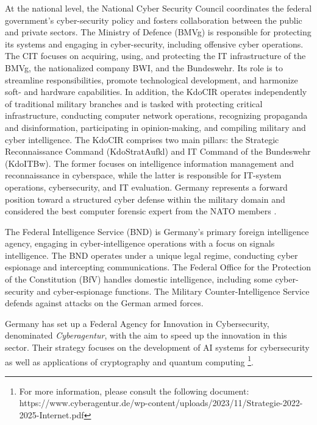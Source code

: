 At the national level, the National Cyber Security Council coordinates the federal government's cyber-security policy and fosters collaboration between the public and private sectors. The Ministry of Defence (BMVg) is responsible for protecting its systems and engaging in cyber-security, including offensive cyber operations. The CIT focuses on acquiring, using, and protecting the IT infrastructure of the BMVg, the nationalized company BWI, and the Bundeswehr. Its role is to streamline responsibilities, promote technological development, and harmonize soft- and hardware capabilities. In addition, the KdoCIR operates independently of traditional military branches and is tasked with protecting critical infrastructure, conducting computer network operations, recognizing propaganda and disinformation, participating in opinion-making, and compiling military and cyber intelligence. The KdoCIR comprises two main pillars: the Strategic Reconnaissance Command (KdoStratAufkl) and IT Command of the Bundeswehr (KdoITBw). The former focuses on intelligence information management and reconnaissance in cyberspace, while the latter is responsible for IT-system operations, cybersecurity, and IT evaluation. Germany represents a forward position toward a structured cyber defense within the military domain and considered the best computer forensic expert from the NATO members \autocite{leinhos_2020_cyber}. 

The Federal Intelligence Service (BND) is Germany's primary foreign intelligence agency, engaging in cyber-intelligence operations with a focus on signals intelligence. The BND operates under a unique legal regime, conducting cyber espionage and intercepting communications. The Federal Office for the Protection of the Constitution (BfV) handles domestic intelligence, including some cyber-security and cyber-espionage functions. The Military Counter-Intelligence Service defends against attacks on the German armed forces. \autocite{theinternationalinstituteforstrategicstudies_2023_cyber, federalministryoftheinteriorbuildingandcommunity_2021_cyber}

Germany has set up a Federal Agency for Innovation in Cybersecurity, denominated \textit{Cyberagentur}, with the aim to speed up the innovation in this sector. Their strategy focuses on the development of AI systems for cybersecurity as well as applications of cryptography and quantum computing \footnote{For more information, please consult the following document: https://www.cyberagentur.de/wp-content/uploads/2023/11/Strategie-2022-2025-Internet.pdf}. 

